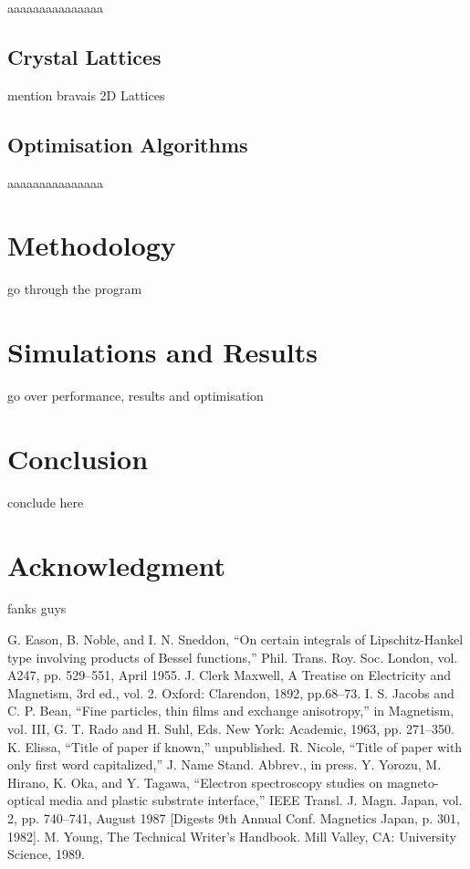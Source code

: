 \documentclass[conference]{IEEEtran}
\begin{document}
aaaaaaaaaaaaaaa

\subsection{Crystal Lattices}

mention bravais 2D Lattices

\subsection{Optimisation Algorithms}

aaaaaaaaaaaaaaa


\section{Methodology}

go through the program


\section{Simulations and Results}

go over performance, results and optimisation

\section{Conclusion}

conclude here

\section*{Acknowledgment}

fanks guys


\begin{thebibliography}{00}
 G. Eason, B. Noble, and I. N. Sneddon, ``On certain integrals of Lipschitz-Hankel type involving products of Bessel functions,'' Phil. Trans. Roy. Soc. London, vol. A247, pp. 529--551, April 1955.
 J. Clerk Maxwell, A Treatise on Electricity and Magnetism, 3rd ed., vol. 2. Oxford: Clarendon, 1892, pp.68--73.
 I. S. Jacobs and C. P. Bean, ``Fine particles, thin films and exchange anisotropy,'' in Magnetism, vol. III, G. T. Rado and H. Suhl, Eds. New York: Academic, 1963, pp. 271--350.
 K. Elissa, ``Title of paper if known,'' unpublished.
 R. Nicole, ``Title of paper with only first word capitalized,'' J. Name Stand. Abbrev., in press.
 Y. Yorozu, M. Hirano, K. Oka, and Y. Tagawa, ``Electron spectroscopy studies on magneto-optical media and plastic substrate interface,'' IEEE Transl. J. Magn. Japan, vol. 2, pp. 740--741, August 1987 [Digests 9th Annual Conf. Magnetics Japan, p. 301, 1982].
 M. Young, The Technical Writer's Handbook. Mill Valley, CA: University Science, 1989.
\end{thebibliography}
\vspace{12pt}
\end{document}
